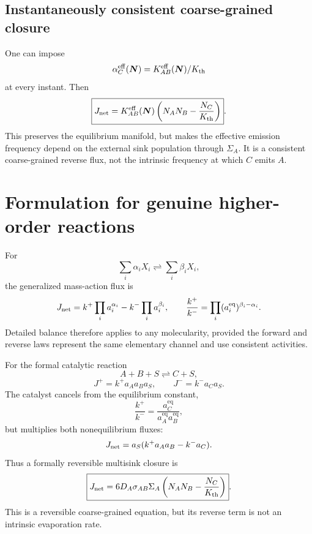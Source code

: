 \documentclass[11pt]{article}
\newcommand{\beq}{\mathrm{eq}}
\newcommand{\eff}{\mathrm{eff}}
\begin{document}
\subsection{Instantaneously consistent coarse-grained closure}
One can impose
\[
 \alpha_C^{\eff}(\bm N)=K_{AB}^{\eff}(\bm N)/K_{\rm th}
\]
at every instant. Then
\begin{equation}
 \boxed{J_{\rm net}=K_{AB}^{\eff}(\bm N)
 \left(N_AN_B-\frac{N_C}{K_{\rm th}}\right)}.
 \label{eq:instantaneous-net}
\end{equation}
This preserves the equilibrium manifold, but makes the effective emission
frequency depend on the external sink population through \(\Sigma_A\). It is
a consistent coarse-grained reverse flux, not the intrinsic frequency at
which \(C\) emits \(A\).

\section{Formulation for genuine higher-order reactions}
For
\[
 \sum_i\alpha_iX_i\rightleftharpoons\sum_i\beta_iX_i,
\]
the generalized mass-action flux is
\begin{equation}
 J_{\rm net}
 =k^+\prod_i a_i^{\alpha_i}
 -k^-\prod_i a_i^{\beta_i},\qquad
 \frac{k^+}{k^-}
 =\prod_i(a_i^{\beq})^{\beta_i-\alpha_i}.
\end{equation}
Detailed balance therefore applies to any molecularity, provided the forward
and reverse laws represent the same elementary channel and use consistent
activities.

For the formal catalytic reaction
\[
 A+B+S\rightleftharpoons C+S,
\]
\[
 J^{+}=k^{+}a_Aa_Ba_S,\qquad J^{-}=k^{-}a_Ca_S.
\]
The catalyst cancels from the equilibrium constant,
\begin{equation}
 \boxed{\frac{k^{+}}{k^{-}}
 =\frac{a_C^{\beq}}{a_A^{\beq}a_B^{\beq}}},
\end{equation}
but multiplies both nonequilibrium fluxes:
\[
 J_{\rm net}=a_S(k^{+}a_Aa_B-k^{-}a_C).
\]
Thus a formally reversible multisink closure is
\begin{equation}
 \boxed{J_{\rm net}
 =6D_A\sigma_{AB}\Sigma_A
 \left(N_AN_B-\frac{N_C}{K_{\rm th}}\right)}.
\end{equation}
This is a reversible coarse-grained equation, but its reverse term is not an
intrinsic evaporation rate.
\end{document}
